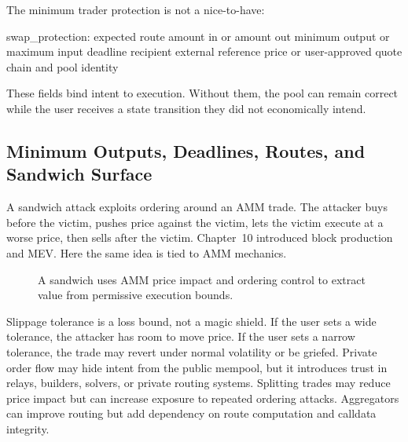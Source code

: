 The minimum trader protection is not a nice-to-have:

\begin{codeblock}
swap_protection:
    expected route
    amount in or amount out
    minimum output or maximum input
    deadline
    recipient
    external reference price or user-approved quote
    chain and pool identity
\end{codeblock}

These fields bind intent to execution. Without them, the pool can remain correct while the user receives a state transition they did not economically intend.

\subsection{Minimum Outputs, Deadlines, Routes, and Sandwich Surface}

A sandwich attack exploits ordering around an AMM trade. The attacker buys before the victim, pushes price against the victim, lets the victim execute at a worse price, then sells after the victim. Chapter~10 introduced block production and MEV. Here the same idea is tied to AMM mechanics.

\begin{figure}[htbp]
\centering
{}
\caption{A sandwich uses AMM price impact and ordering control to extract value from permissive execution bounds.}
\end{figure}

Slippage tolerance is a loss bound, not a magic shield. If the user sets a wide tolerance, the attacker has room to move price. If the user sets a narrow tolerance, the trade may revert under normal volatility or be griefed. Private order flow may hide intent from the public mempool, but it introduces trust in relays, builders, solvers, or private routing systems. Splitting trades may reduce price impact but can increase exposure to repeated ordering attacks. Aggregators can improve routing but add dependency on route computation and calldata integrity.


